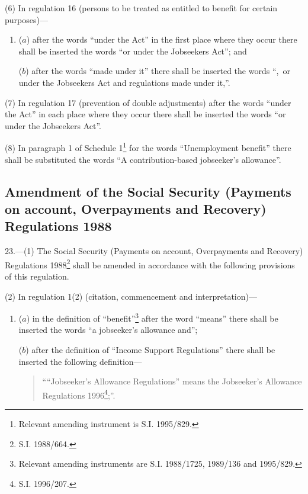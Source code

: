 \documentclass[a4paper]{article}
\begin{document}
(6) In regulation 16 (persons to be treated as entitled to benefit for certain purposes)—
\begin{enumerate}\item[]
($a$) after the words “under the Act” in the first place where they occur there shall be inserted the words “or under the Jobseekers Act”; and

($b$) after the words “made under it” there shall be inserted the words “,~or under the Jobseekers Act and regulations made under it,”.
\end{enumerate}

(7) In regulation 17 (prevention of double adjustments) after the words “under the Act” in each place where they occur there shall be inserted the words “or under the Jobseekers Act”.

(8) In paragraph 1 of Schedule 1\footnote{\frenchspacing Relevant amending instrument is S.I. 1995/829.} for the words “Unemployment benefit” there shall be substituted the words “A contribution-based jobseeker’s allowance”.

\subsection[23. Amendment of the Social Security (Payments on account, Overpayments and Recovery) Regulations 1988]{Amendment of the Social Security (Payments on account, Overpayments and Recovery) Regulations 1988}

23.—(1) The Social Security (Payments on account, Overpayments and Recovery) Regulations 1988\footnote{\frenchspacing S.I. 1988/664.} shall be amended in accordance with the following provisions of this regulation.

(2) In regulation 1(2) (citation, commencement and interpretation)—
\begin{enumerate}\item[]
($a$) in the definition of “benefit”\footnote{\frenchspacing Relevant amending instruments are S.I. 1988/1725, 1989/136 and 1995/829.} after the word “means” there shall be inserted the words “a jobseeker’s allowance and”;

($b$) after the definition of “Income Support Regulations” there shall be inserted the following definition—
\begin{quotation}
\begin{sloppypar}
““Jobseeker’s Allowance Regulations” means the Jobseeker’s Allowance Regulations 1996\footnote{\frenchspacing S.I. 1996/207.};”.
\end{sloppypar}
\end{quotation}
\end{enumerate}
\end{document}
